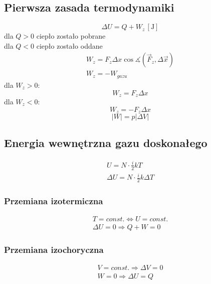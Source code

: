 \documentclass{article}
\numberwithin{equation}{section}
\newcommand{\unit}[1]{\, \left[\mathrm{#1}\right]}
\begin{document}
    \subsection{Pierwsza zasada termodynamiki}
      \begin{equation}
        \Delta U = Q + W_z \unit{J}
      \end{equation}
      dla $Q > 0$ ciepło zostało pobrane\\
      dla $Q < 0$ ciepło zostało oddane
      \begin{gather}
        W_z = F_z\Delta x\cos\measuredangle (\vec F_z, \Delta\vec x)\\
        W_z = -W_{gazu}
      \end{gather}
      dla $W_z > 0$:
      \begin{equation}
        W_z = F_z\Delta x
      \end{equation}
      dla $W_z < 0$:
      \begin{equation}
        W_z = -F_z\Delta x
      \end{equation}
      \begin{equation}
        |W| = p|\Delta V|
      \end{equation}
    \subsection{Energia wewnętrzna gazu doskonałego}
      \begin{gather}
        U = N\cdot\frac{i}{2}kT\\
        \Delta U = N\cdot\frac{i}{2}k\Delta T
      \end{gather}
      \subsubsection{Przemiana izotermiczna}
        \begin{gather}
          T = const. \Leftrightarrow U = const.\\
          \Delta U = 0 \Rightarrow Q + W = 0
        \end{gather}
      \subsubsection{Przemiana izochoryczna}
        \begin{gather}
          V = const. \Rightarrow \Delta V = 0\\
          W = 0 \Rightarrow \Delta U = Q
        \end{gather}
\end{document}
